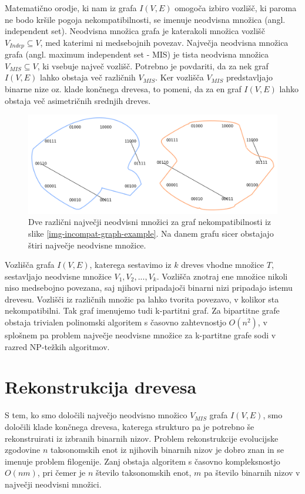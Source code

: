 \documentclass[a4paper, 12pt]{book}
\begin{document}
Matematično orodje, ki nam iz grafa $I(V, E)$ omogoča izbiro vozlišč, ki paroma ne bodo kršile pogoja nekompatibilnosti, se imenuje neodvisna množica (angl. independent set). Neodvisna množica grafa je katerakoli množica vozlišč $V_{Indep} \subseteq V$, med katerimi ni medsebojnih povezav. Največja neodvisna množica grafa (angl. maximum independent set - MIS) je tista neodvisna množica $V_{MIS} \subseteq V$, ki vsebuje največ vozlišč. Potrebno je povdariti, da za nek graf $I(V, E)$ lahko obstaja več različnih $V_{MIS}$. Ker vozlišča $V_{MIS}$ predstavljajo binarne nize oz. klade končnega drevesa, to pomeni, da za en graf $I(V, E)$ lahko obstaja več asimetričnih srednjih dreves.

\begin{figure}
	\begin{center}
		\includegraphics[scale=0.46]{gfx/incompat_graphs_pair.png}
	\end{center}
	\caption{Dve različni največji neodvisni množici za graf nekompatibilnosti iz slike \ref{img-incompat-graph-example}. Na danem grafu sicer obstajajo štiri največje neodvisne množice.}
	\label{img-mis-examples}
\end{figure}

Vozlišča grafa $I(V, E)$, katerega sestavimo iz $k$ dreves vhodne množice $T$, sestavljajo neodvisne množice $V_1, V_2, ..., V_k$. Vozlišča znotraj ene množice nikoli niso medsebojno povezana, saj njihovi pripadajoči binarni nizi pripadajo istemu drevesu. Vozlišči iz različnih množic pa lahko tvorita povezavo, v kolikor sta nekompatibilni. Tak graf imenujemo tudi k-partitni graf. Za bipartitne grafe obstaja trivialen polinomski algoritem s časovno zahtevnostjo $O(n^2)$, v splošnem pa problem največje neodvisne množice za k-partitne grafe sodi v razred NP-težkih algoritmov\cite{pw}. 

\section{Rekonstrukcija drevesa}
S tem, ko smo določili največjo neodvisno množico $V_{MIS}$ grafa $I(V, E)$, smo določili klade končnega drevesa, katerega strukturo pa je potrebno še rekonstruirati iz izbranih binarnih nizov. Problem rekonstrukcije evolucijske zgodovine $n$ taksonomskih enot iz njihovih binarnih nizov je dobro znan in se imenuje problem filogenije. Zanj obstaja algoritem s časovno kompleksnostjo $O(nm)$, pri čemer je $n$ število taksonomskih enot, $m$ pa število binarnih nizov v največji neodvisni množici\cite{gd}.
\end{document}
